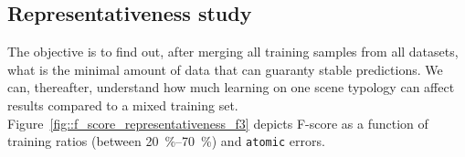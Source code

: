     \subsection{Representativeness study}
        \label{subsec::more_experiments::scalability::representativeness}
        The objective is to find out, after merging all training samples from all datasets, what is the minimal amount of data that can guaranty stable predictions.
        We can, thereafter, understand how much learning on one scene typology can affect results compared to a mixed training set.
        Figure~\ref{fig::f_score_representativeness_f3} depicts F-score as a function of training ratios (between \SIrange[range-phrase={ and }]{20}{70}{\percent}) and \texttt{atomic} errors.\\
                
        \begin{figure}[htbp]
        \end{figure}
            
